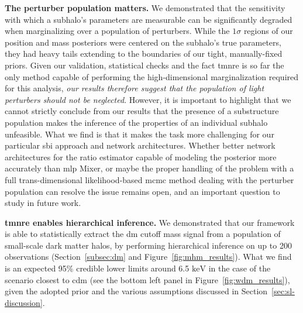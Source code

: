 \noindent\textbf{The perturber population matters.} We demonstrated that the sensitivity with which a subhalo's parameters are measurable can be significantly degraded when marginalizing over a population of perturbers. While the $1\sigma$ regions of our position and mass posteriors were centered on the subhalo's true parameters, they had heavy tails extending to the boundaries of our tight, manually-fixed priors. Given our validation, statistical checks and the fact \gls*{tmnre} is so far the only method capable of performing the high-dimensional marginalization required for this analysis, \emph{our results therefore suggest that the population of light perturbers should not be neglected}. However, it is important to highlight that we cannot strictly conclude from our results that the presence of a substructure population makes the inference of the properties of an individual subhalo unfeasible. What we find is that it makes the task more challenging for our particular \gls*{sbi} approach and network architectures. Whether better network architectures for the ratio estimator capable of modeling the posterior more accurately than \gls*{mlp} Mixer, or maybe the proper handling of the problem with a full trans-dimensional likelihood-based \gls*{mcmc} method dealing with the perturber population can resolve the issue remains open, and an important question to study in future work.
  
\noindent\textbf{\gls*{tmnre} enables hierarchical inference.} We demonstrated that our framework is able to statistically extract the \gls*{dm} cutoff mass signal from a population of small-scale dark matter halos, by performing hierarchical inference on up to 200 observations (Section~\ref{subsec:dm} and Figure~\ref{fig:mhm_results}). What we find is an expected 95\% credible lower limits around 6.5 $\si{\keV}$ in the case of the scenario closest to \gls*{cdm} (see the bottom left panel in Figure~\ref{fig:wdm_results}), given the adopted prior and the various assumptions discussed in Section~\ref{sec:sl-discussion}. 


